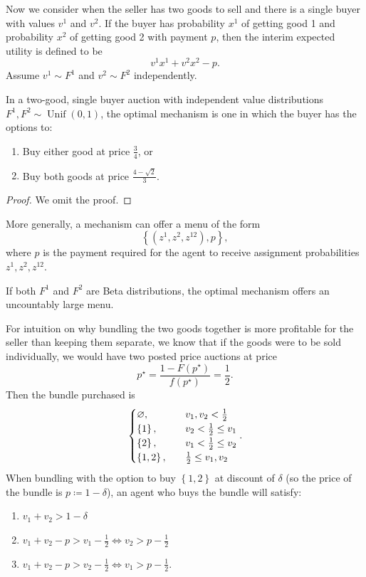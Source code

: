 Now we consider when the seller has two goods to sell and there is a single buyer with values $v^1$ and $v^2$. If the buyer has probability $x^1$ of getting good 1 and probability $x^2$ of getting good 2 with payment $p$, then the interim expected utility is defined to be \[
	v^1x^1 + v^2x^2 - p
.\] Assume $v^1 \sim F^{1}$ and $v^2 \sim F^2$ independently.

\begin{proposition}
	In a two-good, single buyer auction with independent value distributions $F^1, F^2 \sim \operatorname{Unif}(0,1)$, the optimal mechanism is one in which the buyer has the options to:
	\begin{enumerate}[label = (\roman*)]
		\item Buy either good at price $\frac{3}{4}$, or
		\item Buy both goods at price $\frac{4-\sqrt{2} }{3}$.
	\end{enumerate}
\end{proposition}
\begin{proof}
	We omit the proof.
\end{proof}

More generally, a mechanism can offer a menu of the form \[
	\left\{\left( z^1, z^2, z^{12} \right),p\right\}
,\] where $p$ is the payment required for the agent to receive assignment probabilities $z^1,z^2,z^{12}$. 
\begin{proposition}
	If both $F^1$ and $F^2$ are Beta distributions, the optimal mechanism offers an uncountably large menu.
\end{proposition}

For intuition on why bundling the two goods together is more profitable for the seller than keeping them separate, we know that if the goods were to be sold individually, we would have two posted price auctions at price \[
	p^\star = \frac{1-F(p^\star)}{f(p^\star)} = \frac{1}{2}
.\] 
Then the bundle purchased is \[
	\begin{cases}
		\varnothing, \quad &v_1, v_2 < \frac{1}{2} \\
		\left\{1\right\}, \quad & v_2< \frac{1}{2} \le v_1 \\
		\left\{2\right\}, \quad & v_1 < \frac{1}{2} \le v_2 \\
		\left\{1,2\right\}, \quad &\frac{1}{2} \le v_1,v_2
	\end{cases}
.\] 
When bundling with the option to buy $\left\{1,2\right\}$ at discount of $\delta$ (so the price of the bundle is $p \coloneqq 1-\delta$), an agent who buys the bundle will satisfy:
\begin{enumerate}[label = (\roman*)]
	\item $v_1 + v_2 > 1-\delta$
	\item $v_1 + v_2 - p > v_1 - \frac{1}{2} \iff v_2 > p - \frac{1}{2}$
	\item $v_1 + v_2 - p > v_2- \frac{1}{2} \iff v_1 > p-\frac{1}{2}$.
\end{enumerate}

